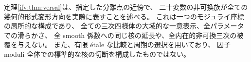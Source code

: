 \begin{remark}[局所完全性と大域問題]
\label{ifv:rem:versal-scope}
定理\ref{ifv:thm:versal}は、指定した分離点の近傍で、
二十変数の非可換族が全ての幾何的形式変形方向を実際に表すことを述べる。
これは一つのモジュライ座標の局所的な構成であり、
全ての三次四様体の大域的な一意表示、全パラメータでの滑らかさ、
全 smooth 係数への同じ核の延長や、全内在的非可換三次の被覆を与えない。
また、有限 \'etale な比較と周期の選択を用いており、
因子 moduli 全体での標準的な核の切断を構成したものではない。
\end{remark}
